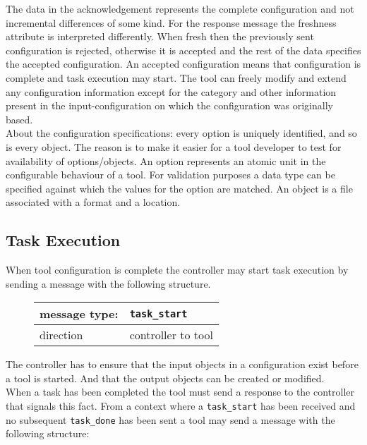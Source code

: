 \documentclass{article}
\newcommand{\msg}[1]{\texttt{#1}}
\begin{document}
   \noindent The data in the acknowledgement represents the complete
   configuration and not incremental differences of some kind. For the response
   message the freshness attribute is interpreted differently.  When fresh then
   the previously sent configuration is rejected, otherwise it is accepted and
   the rest of the data specifies the accepted configuration.  An accepted
   configuration means that configuration is complete and task execution may
   start.  The tool can freely modify and extend any configuration information
   except for the category and other information present in the
   input-configuration on which the configuration was originally based.
   \\[4pt]
   \noindent About the configuration specifications: every option is uniquely
   identified, and so is every object. The reason is to make it easier for a
   tool developer to test for availability of options/objects.  An option
   represents an atomic unit in the configurable behaviour of a tool. For
   validation purposes a data type can be specified against which the values
   for the option are matched. An object is a file associated with a format and
   a location.

  \subsection{Task Execution}

   \noindent When tool configuration is complete the controller may start task
   execution by sending a message with the following structure.

   \begin{figure}[H]
    \begin{center}
     \begin{tabular}{|ll|}
      \hline
       message type:   & \msg{task\_start} \\
      \hline
       direction       & controller to tool \\
      \hline
     \end{tabular}
    \end{center}
   \end{figure}

   \noindent The controller has to ensure that the input objects in a
   configuration exist before a tool is started. And that the output objects
   can be created or modified.
   \\[4pt]
   When a task has been completed the tool must send a response to the
   controller that signals this fact. From a context where a \msg{task\_start}
   has been received and no subsequent \msg{task\_done} has been sent a tool
   may send a message with the following structure:
\end{document}
